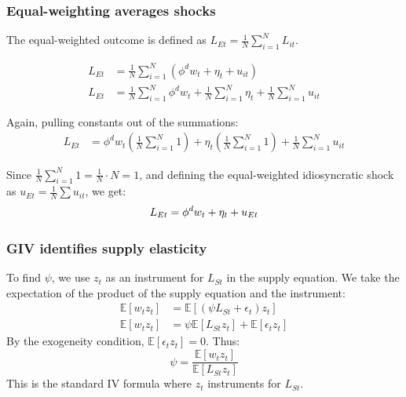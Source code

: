 \documentclass[aspectratio=169,11pt]{beamer}
\begin{document}
\begin{frame} \label{app_equal_weighted}
    \frametitle{Equal-weighting averages shocks}
    The equal-weighted outcome is defined as $L_{Et} = \frac{1}{N} \sum_{i=1}^N L_{it}$.

    \begin{align*}
        L_{Et} & = \frac{1}{N} \sum_{i=1}^N (\phi^d w_t + \eta_t + u_{it})                                                 \\
        L_{Et} & = \frac{1}{N} \sum_{i=1}^N \phi^d w_t + \frac{1}{N} \sum_{i=1}^N \eta_t + \frac{1}{N} \sum_{i=1}^N u_{it}
    \end{align*}

    Again, pulling constants out of the summations:
    \begin{align*}
        L_{Et} & = \phi^d w_t \left( \frac{1}{N} \sum_{i=1}^N 1 \right) + \eta_t \left( \frac{1}{N} \sum_{i=1}^N 1 \right) + \frac{1}{N} \sum_{i=1}^N u_{it}
    \end{align*}

    Since $\frac{1}{N} \sum_{i=1}^N 1 = \frac{1}{N} \cdot N = 1$, and defining the equal-weighted idiosyncratic shock as $u_{Et} = \frac{1}{N} \sum u_{it}$, we get:
    \begin{equation}
        L_{Et} = \phi^d w_t + \eta_t + u_{Et} \notag
    \end{equation}
    \vspace{0.1cm}
    \hfill \hyperlink{src_equal_weighted}{}
\end{frame}

\begin{frame} \label{app_psi_identification}
    \frametitle{GIV identifies supply elasticity}
    To find $\psi$, we use $z_t$ as an instrument for $L_{St}$ in the supply equation. We take the expectation of the product of the supply equation and the instrument:
    \begin{align*}
        \mathbb{E}[w_t z_t] & = \mathbb{E}[(\psi L_{St} + \epsilon_t) z_t]               \\
        \mathbb{E}[w_t z_t] & = \psi \mathbb{E}[L_{St} z_t] + \mathbb{E}[\epsilon_t z_t]
    \end{align*}
    By the exogeneity condition, $\mathbb{E}[\epsilon_t z_t] = 0$. Thus:
    \begin{equation}
        \psi = \frac{\mathbb{E}[w_t z_t]}{\mathbb{E}[L_{St} z_t]}
    \end{equation}
    This is the standard IV formula where $z_t$ instruments for $L_{St}$.
    \vspace{0.1cm}
    \hfill \hyperlink{src_psi_identification}{}
\end{frame}
\end{document}
